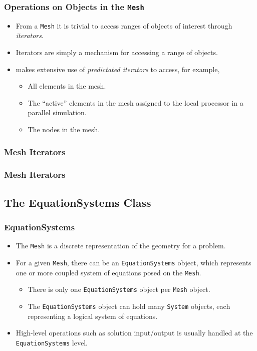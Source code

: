 \begin{frame}
  \frametitle{Operations on Objects in the \texttt{Mesh}}
  \begin{block}{}
    \begin{itemize}
    \item From a \texttt{Mesh} it is trivial to access ranges of objects of interest through \emph{iterators}.
    \item Iterators are simply a mechanism for accessing a range of objects.
    \item \libMesh{} makes extensive use of \emph{predictated iterators} to access, for example,
      \begin{itemize}
        \item All elements in the mesh.
        \item The ``active'' elements in the mesh assigned to the local processor in a parallel simulation.
        \item The nodes in the mesh.
      \end{itemize}
  \end{itemize}
  \end{block}
\end{frame}

\begin{frame}[shrink]
  \frametitle{Mesh Iterators}
  
\end{frame}

\begin{frame}[shrink]
  \frametitle{Mesh Iterators}
  
\end{frame}



\subsection{The EquationSystems Class}
\begin{frame}
  \frametitle{EquationSystems}
  \begin{block}{}
    \begin{itemize}
      \item The \texttt{Mesh} is a discrete representation of the geometry for a problem.
      \item For a given \texttt{Mesh}, there can be an \texttt{EquationSystems} object, which represents one or more coupled system of equations posed on the \texttt{Mesh}.
        \begin{itemize}
          \item There is only one \texttt{EquationSystems} object per \texttt{Mesh} object.
          \item The \texttt{EquationSystems} object can hold many \texttt{System} objects, each representing a logical system of equations.
        \end{itemize}
      \item High-level operations such as solution input/output is usually handled at the \texttt{EquationSystems} level.
    \end{itemize}
  \end{block}
\end{frame}

